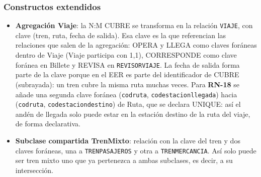 \documentclass[11pt,a4paper]{article}
\DeclareRobustCommand{\_}{\textunderscore\allowbreak}
\newcommand{\RN}[1]{\textbf{RN-#1}}
\newcommand{\tb}[1]{\texttt{#1}}
\begin{document}
\subsubsection*{Constructos extendidos}
\begin{itemize}
\item \textbf{Agregación Viaje}: la N:M CUBRE se transforma en la relación \tb{VIAJE}, con clave (tren, ruta, fecha de salida). Esa clave es la que referencian las relaciones que salen de la agregación: OPERA y LLEGA como claves foráneas dentro de Viaje (Viaje participa con 1,1), CORRESPONDE como clave foránea en Billete y REVISA en \tb{REVISOR\_VIAJE}. La fecha de salida forma parte de la clave porque en el EER es parte del identificador de CUBRE (subrayada): un tren cubre la misma ruta muchas veces. Para \RN{18} se añade una segunda clave foránea (\tb{cod\_ruta}, \tb{cod\_estacion\_llegada}) hacia (\tb{cod\_ruta}, \tb{cod\_estacion\_destino}) de Ruta, que se declara UNIQUE: así el andén de llegada solo puede estar en la estación destino de la ruta del viaje, de forma declarativa.
\item \textbf{Subclase compartida Tren\_Mixto}: relación con la clave del tren y dos claves foráneas, una a \tb{TREN\_PASAJEROS} y otra a \tb{TREN\_MERCANCIA}. Así solo puede ser tren mixto uno que ya pertenezca a ambas subclases, es decir, a su intersección.
\end{itemize}
\end{document}
